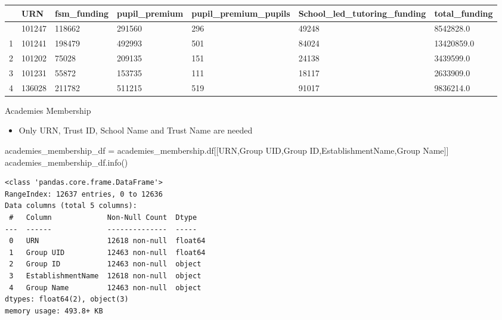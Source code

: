 \documentclass[
  letterpaper,
  DIV=11,
  numbers=noendperiod]{scrartcl}
\newenvironment{Shaded}{\begin{snugshade}}{\end{snugshade}}
\newcommand{\NormalTok}[1]{\textcolor[rgb]{0.00,0.23,0.31}{#1}}
\newcommand{\OperatorTok}[1]{\textcolor[rgb]{0.37,0.37,0.37}{#1}}
\newcommand{\StringTok}[1]{\textcolor[rgb]{0.13,0.47,0.30}{#1}}
\providecommand{\tightlist}{%
  \setlength{\itemsep}{0pt}\setlength{\parskip}{0pt}}\usepackage{longtable,booktabs,array}
\begin{document}
\begin{longtable}[]{@{}lllllll@{}}
\toprule\noalign{}
& URN & fsm\_funding & pupil\_premium & pupil\_premium\_pupils &
School\_led\_tutoring\_funding & total\_funding \\
\midrule\noalign{}
\endhead
\bottomrule\noalign{}
\endlastfoot
0 & 101247 & 118662 & 291560 & 296 & 49248 & 8542828.0 \\
1 & 101241 & 198479 & 492993 & 501 & 84024 & 13420859.0 \\
2 & 101202 & 75028 & 209135 & 151 & 24138 & 3439599.0 \\
3 & 101231 & 55872 & 153735 & 111 & 18117 & 2633909.0 \\
4 & 136028 & 211782 & 511215 & 519 & 91017 & 9836214.0 \\
\end{longtable}

Academies Membership

\begin{itemize}
\tightlist
\item
  Only URN, Trust ID, School Name and Trust Name are needed
\end{itemize}

\begin{Shaded}
\begin{Highlighting}[]
\NormalTok{academies\_membership\_df }\OperatorTok{=}\NormalTok{ academies\_membership.df[[}\StringTok{\textquotesingle{}URN\textquotesingle{}}\NormalTok{,}\StringTok{\textquotesingle{}Group UID\textquotesingle{}}\NormalTok{,}\StringTok{\textquotesingle{}Group ID\textquotesingle{}}\NormalTok{,}\StringTok{\textquotesingle{}EstablishmentName\textquotesingle{}}\NormalTok{,}\StringTok{\textquotesingle{}Group Name\textquotesingle{}}\NormalTok{]]}
\NormalTok{academies\_membership\_df.info()}
\end{Highlighting}
\end{Shaded}

\begin{verbatim}
<class 'pandas.core.frame.DataFrame'>
RangeIndex: 12637 entries, 0 to 12636
Data columns (total 5 columns):
 #   Column             Non-Null Count  Dtype  
---  ------             --------------  -----  
 0   URN                12618 non-null  float64
 1   Group UID          12463 non-null  float64
 2   Group ID           12463 non-null  object 
 3   EstablishmentName  12618 non-null  object 
 4   Group Name         12463 non-null  object 
dtypes: float64(2), object(3)
memory usage: 493.8+ KB
\end{verbatim}
\end{document}
